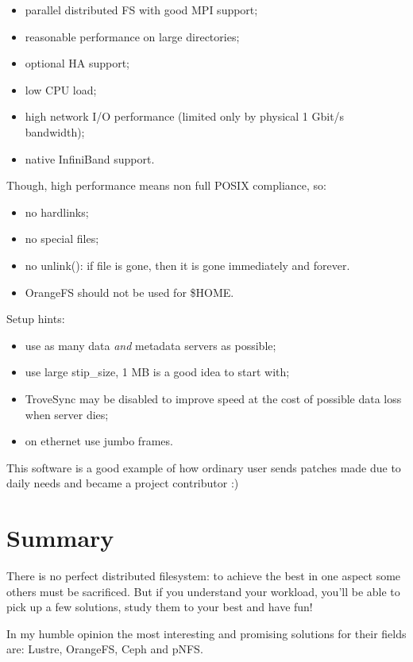 \documentclass[10pt, a5paper]{article}
\begin{document}
\begin{itemize}
  \item parallel distributed FS with good MPI support;
  \item reasonable performance on large directories;
  \item optional HA support;
  \item low CPU load;
  \item high network I/O performance (limited only by physical 1 Gbit/s bandwidth);
  \item native InfiniBand\cite{bib15} support.
\end{itemize}

Though, high performance means non full POSIX compliance, so:

\begin{itemize}
  \item no hardlinks;
  \item no special files;
  \item no unlink(): if file is gone, then it is gone immediately and forever.
  \item OrangeFS should not be used for \$HOME.
\end{itemize}

Setup hints:

\begin{itemize}
  \item use as many data \emph{and} metadata servers as possible;
  \item use large stip\_size, 1 MB is a good idea to start with;
  \item TroveSync may be disabled to improve speed at the cost of possible data loss when server dies;
  \item on ethernet use jumbo frames.
\end{itemize}

This software is a good example of how ordinary user sends patches made due to daily needs and became a project contributor :)

\section*{Summary}

There is no perfect distributed filesystem: to achieve the best in one aspect some others must be sacrificed. But if you understand your workload, you'll be able to pick up a few solutions, study them to your best and have fun!

In my humble opinion the most interesting and promising solutions for their fields are: Lustre\cite{bib10}, OrangeFS\cite{bib11}, Ceph\cite{bib12} and pNFS\cite{bib4}.
\end{document}
